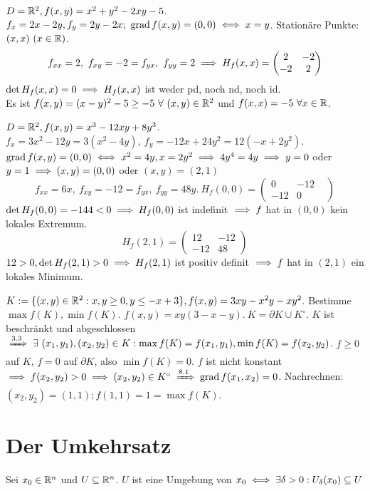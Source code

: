 \documentclass[a4paper,oneside,DIV15,BCOR12mm,chapterprefix=true,headings=onelinechapter]{scrbook}
\begin{document}
\begin{beispiele}
\item $D=\mathbb{R}^2, f(x,y)=x^2+y^2-2xy-5$. $f_x=2x-2y, f_y=2y-2x;\ \grad f(x,y)=(0,0)\equizu x=y$. Stationäre Punkte: $(x,x)\ (x\in\mathbb{R})$.\\
$$f_{xx}=2,\ f_{xy}=-2=f_{yx},\ f_{yy}=2\folgt H_f(x,x)=\begin{pmatrix}2&-2\\-2&2\end{pmatrix}$$
$\det H_f(x,x)=0\implies H_f(x,x)$ ist weder pd, noch nd, noch id.\\
Es ist $f(x,y)=(x-y)^2-5\ge -5\ \forall\ (x,y)\in\MdR^2$ und $f(x,x)=-5\ \forall x\in\mathbb{R}$.
\item $D=\mathbb{R}^2, f(x,y)=x^3-12xy+8y^3$.\\
$f_x=3x^2-12y=3(x^2-4y),\ f_y=-12x+24y^2=12(-x+2y^2)$. $\grad f(x,y)=(0,0)\equizu x^2=4y, x=2y^2\folgt 4y^4=4y\folgt y=0$ oder $y=1\implies (x,y)=(0,0)$ oder $(x,y)=(2,1)$\\
$$f_{xx}=6x,\ f_{xy}=-12=f_{yx},\ f_{yy}=48y.\ H_f(0,0)=\begin{pmatrix}0&-12&\\-12&0\end{pmatrix}$$
$\det H_f(0,0)=-144<0\implies H_f(0,0)$ ist indefinit $\implies f$ hat in $(0,0)$ kein lokales Extremum. 
$$H_f(2,1)=\begin{pmatrix}12&-12\\-12&48\end{pmatrix}$$
$12>0, \det H_f(2,1)>0\implies H_f(2,1)$ ist positiv definit $\implies f$ hat in $(2,1)$ ein lokales Minimum.
\item $K:=\{(x,y)\in\mathbb{R}^2: x,y\ge 0, y\le -x+3\}, f(x,y)=3xy-x^2y-xy^2$. Bestimme $\max f(K), \min f(K)$. $f(x,y)=xy(3-x-y).\ K=\partial K \cup K^\circ$. $K$ ist beschränkt und abgeschlossen $\folgtnach{3.3}\exists\ (x_1,y_1), (x_2,y_2)\in K: \max f(K)=f(x_1, y_1), \min f(K)=f(x_2,y_2)$. $f\ge 0$ auf $K$, $f=0$ auf $\partial K$, also $\min f(K)=0$. $f$ ist nicht konstant $\folgt f(x_2,y_2)>0\folgt (x_2,y_2)\in K^\circ\folgtnach{8.1}\grad f(x_1,x_2)=0$. Nachrechnen: $(x_2,y_2)=(1,1); f(1,1)=1=\max f(K)$.
\end{beispiele}

\chapter{Der Umkehrsatz}
\def\grad{\mathop{\rm grad}\nolimits}

\begin{erinnerung}
Sei $x_0\in\mathbb{R}^n$ und $U\subseteq\mathbb{R}^n$. $U$ ist eine Umgebung von $x_0\iff\exists\delta>0:U_\delta(x_0)\subseteq U$
\end{erinnerung}
\end{document}
